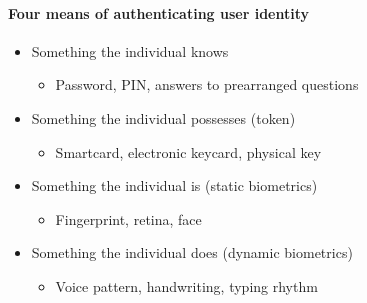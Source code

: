 \documentclass{article}
\begin{document}
                
                \paragraph{Four means of authenticating user identity}
                \begin{itemize}
                    \item Something the individual knows
                    \begin{itemize}
                        \item Password, PIN, answers to prearranged questions
                    \end{itemize}
                    \item Something the individual possesses (token)
                    \begin{itemize}
                        \item Smartcard, electronic keycard, physical key
                    \end{itemize}
                    \item Something the individual is (static biometrics)
                    \begin{itemize}
                        \item Fingerprint, retina, face
                    \end{itemize}
                    \item Something the individual does (dynamic biometrics)
                    \begin{itemize}
                        \item Voice pattern, handwriting, typing rhythm
                    \end{itemize}
                \end{itemize}
                
\end{document}
